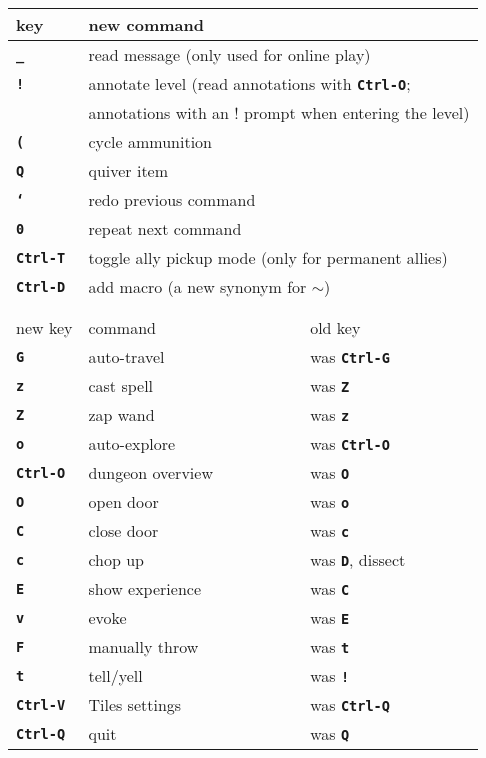 \documentclass[a4paper,10pt]{article}
\newcommand{\key}[1]{{{\texttt{\textbf{#1}}}}} %
\newcommand{\mc}[1]{\multicolumn{2}{l}{#1}}
\begin{document}
\begin{center}
\begin{tabular}{lll}
key          & new command \\ \hline
\key{\_}     & \mc{read message (only used for online play)} \\
\key{!}      & \mc{annotate level (read annotations with \key{Ctrl-O};} \\
             & \mc{annotations with an ! prompt when entering the level)} \\
\key{(}      & \mc{cycle ammunition} \\
\key{Q}      & \mc{quiver item}      \\
\key{`}      & \mc{redo previous command} \\
\key{0}      & \mc{repeat next command} \\
\key{Ctrl-T} & \mc{toggle ally pickup mode (only for permanent allies)} \\
\key{Ctrl-D} & \mc{add macro (a new synonym for \key{$\sim$})} \\
\\
\\
new key      & command          & old key \\ \hline
\key{G}      & auto-travel      & was \key{Ctrl-G} \\
\key{z}      & cast spell       & was \key{Z}      \\
\key{Z}      & zap wand         & was \key{z}      \\
\key{o}      & auto-explore     & was \key{Ctrl-O} \\
\key{Ctrl-O} & dungeon overview\phantom{xxx} & was \key{O}      \\
\key{O}      & open door        & was \key{o}      \\
\key{C}      & close door       & was \key{c}      \\
\key{c}      & chop up          & was \key{D}, dissect \\
\key{E}      & show experience  & was \key{C}      \\
\key{v}      & evoke            & was \key{E}      \\
\key{F}      &  manually throw  & was \key{t}      \\
\key{t}      & tell/yell        & was \key{!}      \\
\key{Ctrl-V} & Tiles settings   & was \key{Ctrl-Q} \\
\key{Ctrl-Q} & quit             & was \key{Q}
\end{tabular}
\end{center}
\end{document}

